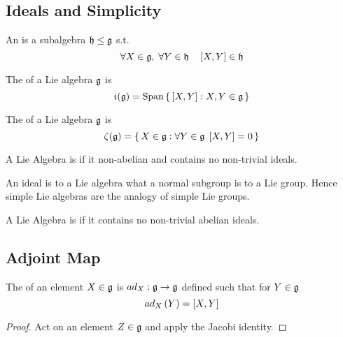 \documentclass{article}
\begin{document}
\subsection{Ideals and Simplicity}

\begin{definition}[ideal]
An  is a subalgebra $\mf{h} \leq \mf{g}$ s.t.
\[
\forall X\in\mf{g}, \; \forall Y\in\mf{h} \quad  \comm[X]{Y}\in\mf{h}
\]
\end{definition}

\begin{definition}
The  of a Lie algebra $\mf{g}$ is 
\[
i(\mf{g})=\spn\set{\comm[X]{Y} : X,Y\in\mf{g}}
\]
\end{definition}

\begin{definition}[Centre]
The  of a Lie algebra $\mf{g}$ is 
\[
\zeta(\mf{g})=\set{X\in\mf{g} : \forall Y\in\mf{g} \; \comm[X]{Y}=0}
\]
\end{definition}

\begin{definition}
A Lie Algebra is  if it non-abelian and contains no non-trivial ideals.
\end{definition}

\begin{idea}
An ideal is to a Lie algebra what a normal subgroup is to a Lie group. Hence simple Lie algebras are the analogy of simple Lie groups.  
\end{idea}

\begin{definition}
A Lie Algebra is  if it contains no non-trivial abelian ideals. 
\end{definition}

\subsection{Adjoint Map}

\begin{definition}
The  of an element $X\in\mf{g}$ is $ad_{X}:\mf{g}\to\mf{g}$ defined such that for $Y\in\mf{g}$
\[
ad_{X}\left(Y\right)=\comm[X]{Y}
\]
\end{definition}

\begin{lemma}
\end{lemma}
\begin{proof}
Act on an element $Z \in \mf{g}$ and apply the Jacobi identity.
\end{proof}
\end{document}
